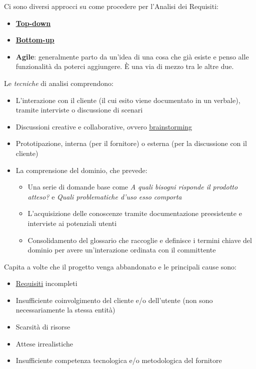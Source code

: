 		Ci sono diversi approcci su come procedere per l'Analisi dei Requisiti:
			\begin{itemize}
				\item \textbf{\underline{\hyperref[topdown]{Top-down}}}
				\item \textbf{\underline{\hyperref[bottomup]{Bottom-up}}}
				\item \textbf{Agile}\label{agile}: generalmente parto da un'idea di una cosa che già esiste e penso alle funzionalità da poterci aggiungere. È una via di mezzo tra le altre due.
			\end{itemize}
		Le \textit{tecniche} di analisi comprendono:
			\begin{itemize}
				\item L'interazione con il cliente (il cui esito viene documentato in un verbale), tramite interviste o discussione di scenari
				\item Discussioni creative e collaborative, ovvero \underline{\hyperref[brainstorming]{brainstorming}}
				\item Prototipazione, interna (per il fornitore) o esterna (per la discussione con il cliente)
				\item La comprensione del dominio, che prevede:
				\begin{itemize}
					\item Una serie di domande base come \textit{A quali bisogni risponde il prodotto atteso?} e \textit{Quali problematiche d’uso esso comporta}
					\item L'acquisizione delle conoscenze tramite documentazione preesistente e interviste ai potenziali utenti
					\item Consolidamento del glossario che raccoglie e definisce i termini chiave del dominio per avere un'interazione ordinata con il committente
				\end{itemize}
			\end{itemize}
		Capita a volte che il progetto venga abbandonato e le principali cause sono:
			\begin{itemize}
				\item \underline{\hyperref[requirements]{Requisiti}} incompleti
				\item Insufficiente coinvolgimento del cliente e/o dell’utente (non sono necessariamente la stessa entità)
				\item Scarsità di risorse
				\item Attese irrealistiche
				\item Insufficiente competenza tecnologica e/o metodologica del fornitore
			\end{itemize}

